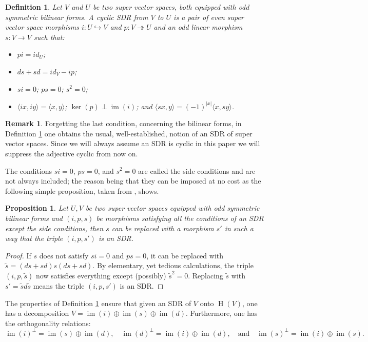 \documentclass[]{amsart}
\newtheorem{proposition}[theorem]{Proposition}
\newtheorem{definition}[theorem]{Definition}
\theoremstyle{definition}
\newtheorem{remark}[theorem]{Remark}
\newcommand{\im}{\operatorname{im}}
\newcommand{\homology}{\operatorname{H}}
\begin{document}
\begin{definition}\label{def_SDR}
Let $V$ and $U$ be two super vector spaces, both equipped with odd symmetric bilinear forms. A cyclic SDR from $V$ to $U$ is a pair of even super vector space morphisms $i\colon U\hookrightarrow V$ and $p\colon V\twoheadrightarrow U$ and an odd linear morphism $s\colon V\to V$ such that:
\begin{itemize}
\item $pi=id_U$;
\item $ds+sd=id_V - ip$;
\item $si=0$; $ps=0$; $s^2=0$;
\item $\langle ix , iy \rangle =\langle x, y\rangle $; $\ker (p) \perp \im (i)$; and $\langle sx,y\rangle=(-1)^{|x|}\langle x , sy\rangle$.
\end{itemize}
\end{definition}

\begin{remark}
Forgetting the last condition, concerning the bilinear forms, in Definition \ref{def_SDR} one obtains the usual, well-established, notion of an SDR of super vector spaces. Since we will always assume an SDR is cyclic in this paper we will suppress the adjective cyclic from now on.
\end{remark}

The conditions $si=0$, $ps=0$, and $s^2=0$ are called the side conditions and are not always included; the reason being that they can be imposed at no cost as the following simple proposition, taken from \cite[Lemma B.6.]{braun_laz_unimodular}, shows.

\begin{proposition}
Let $U,V$ be two super vector spaces equipped with odd symmetric bilinear forms and $(i,p,s)$ be morphisms satisfying all the conditions of an SDR except the side conditions, then $s$ can be replaced with a morphism $s'$ in such a way that the triple $(i,p,s')$ is an SDR.
\end{proposition}
\begin{proof}
If $s$ does not satisfy $si=0$ and $ps=0$, it can be replaced with $\tilde{s}=(ds+sd)s(ds+sd)$. By elementary, yet tedious calculations, the triple $(i,p,\tilde{s})$ now satisfies everything except (possibly) $\tilde{s}^2=0$. Replacing $\tilde{s}$ with $s'=\tilde{s}d\tilde{s}$ means the triple $(i,p,s')$ is an SDR.
\end{proof}

The properties of Definition \ref{def_SDR} ensure that given an SDR of $V$ onto $\homology (V)$, one has a decomposition $V=\im (i)\oplus\im (s)\oplus\im (d)$. Furthermore, one has the orthogonality relations:
\[
\im (i)^{\perp}= \im (s) \oplus \im (d),\quad\im (d)^{\perp}= \im (i) \oplus \im (d),\quad\mathrm{and}\quad\im (s)^{\perp}= \im (i) \oplus \im (s).
\]
\end{document}
